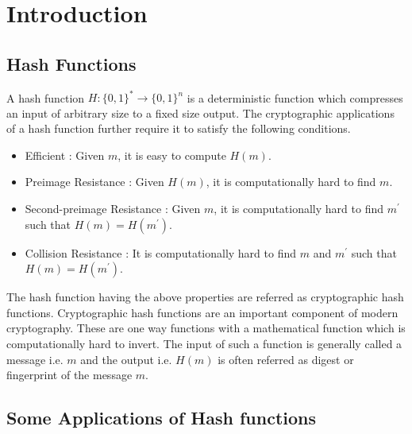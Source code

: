 \chapter{Introduction}
\label{chap:intro}

\section{Hash Functions}

A hash function $H:\{0,1\}^* \rightarrow \{0,1\}^n $ is a deterministic function which compresses an input of arbitrary size to a fixed size output. The cryptographic applications of a hash function further require it to satisfy the following conditions.

\begin{itemize}\setlength\itemindent{20pt}
    \item Efficient : Given $m$, it is easy to compute $H(m)$.
    \item Preimage Resistance : Given $H(m)$, it is computationally hard to find $m$.
    \item Second-preimage Resistance : Given $m$, it is computationally hard to find $m^\prime$ such that $H(m)=H(m^\prime)$.
    \item Collision Resistance : It is computationally hard to find $m$ and $m^\prime$ such that $H(m)=H(m^\prime)$.
\end{itemize}

The hash function having the above properties are referred as cryptographic hash functions. Cryptographic hash functions are an important component of modern cryptography. These are one way functions with a mathematical function which is computationally hard to invert. The input of such a function is generally called a message i.e. $m$ and the output i.e. $H(m)$ is often referred as digest or fingerprint of the message $m$.

\section{Some Applications of Hash functions}

